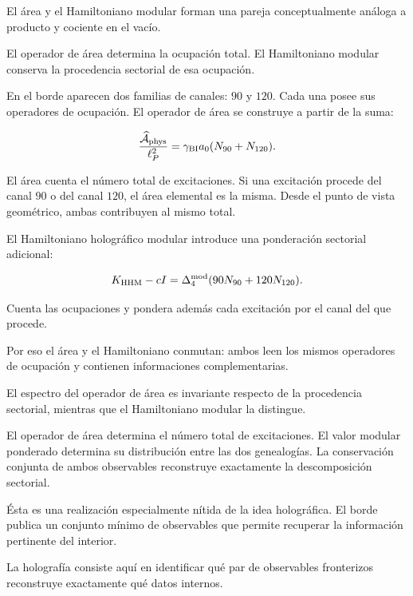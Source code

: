 El área y el Hamiltoniano modular forman una pareja conceptualmente análoga a producto y cociente en el vacío.\par

El operador de área determina la ocupación total. El Hamiltoniano modular conserva la procedencia sectorial de esa ocupación.\par

En el borde aparecen dos familias de canales: \(90\) y \(120\). Cada una posee sus operadores de ocupación. El operador de área se construye a partir de la suma:\par

\[
\frac{\widehat{\mathcal A}_{\rm phys}}{\ell_P^2}
=
\gamma_{\rm BI}a_0
(N_{90}+N_{120}).
\]

El área cuenta el número total de excitaciones. Si una excitación procede del canal \(90\) o del canal \(120\), el área elemental es la misma. Desde el punto de vista geométrico, ambas contribuyen al mismo total.\par

El Hamiltoniano holográfico modular introduce una ponderación sectorial adicional:\par

\[
K_{\rm HHM}-cI
=
\Delta_4^{\rm mod}
(90N_{90}+120N_{120}).
\]

Cuenta las ocupaciones y pondera además cada excitación por el canal del que procede.\par

Por eso el área y el Hamiltoniano conmutan: ambos leen los mismos operadores de ocupación y contienen informaciones complementarias.\par

El espectro del operador de área es invariante respecto de la procedencia sectorial, mientras que el Hamiltoniano modular la distingue.\par

El operador de área determina el número total de excitaciones. El valor modular ponderado determina su distribución entre las dos genealogías. La conservación conjunta de ambos observables reconstruye exactamente la descomposición sectorial.\par

Ésta es una realización especialmente nítida de la idea holográfica. El borde publica un conjunto mínimo de observables que permite recuperar la información pertinente del interior.\par

La holografía consiste aquí en identificar qué par de observables fronterizos reconstruye exactamente qué datos internos.\par

